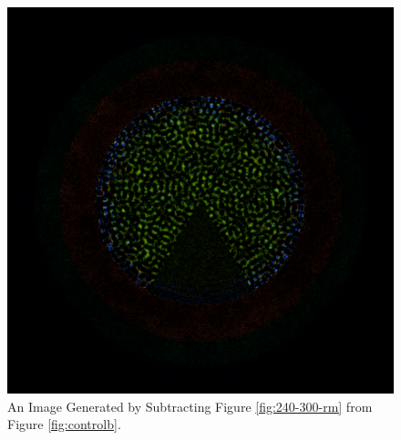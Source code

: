 \begin{figure}[H]
\centering
\includegraphics[width=0.6\linewidth]{figures/240-300/diff-240-300}
\caption{An Image Generated by Subtracting Figure \ref{fig:240-300-rm} from Figure \ref{fig:controlb}.}
\label{fig:240-300-diff}
\end{figure}